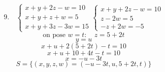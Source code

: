 \documentclass{article}
\begin{document}
\[
\text{9.} \quad
\begin{cases}
x+y+2z-w=10 \\
x+y+z+w=5 \\
x+y+3z-3w=15
\end{cases}
\begin{cases}
x+y+2z-w=10 \\
z-2w=5 \\
-z+2w=-5
\end{cases}
\]
\[
\text{on pose } w=t: \quad z=5+2t
\]
\[
y=u
\]
\[
x+u+2(5+2t)-t=10
\]
\[
x+u+10+4t-t=10
\]
\[
x=-u-3t
\]
\[
S=\{(x,y,z,w)=(-u-3t, u, 5+2t, t)\}
\]
\end{document}

